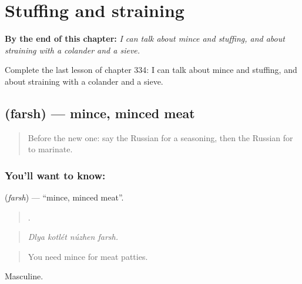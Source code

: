 
\chapter{Stuffing and straining}
\label{ch:ru-stuffing-and-straining}

\begin{chapteropening}
\textbf{By the end of this chapter:} \emph{I can talk about mince and stuffing, and about straining with a colander and a sieve.}

Complete the last lesson of chapter 334: I can talk about mince and stuffing, and about straining with a colander and a sieve.
\end{chapteropening}

\section[\texorpdfstring{\ru{фарш} (farsh)}{фарш (farsh)}]{ (farsh) — mince, minced meat}

\label{lesson:RU-C334-farsh}



\begin{quote}
Before the new one: say the Russian for a seasoning, then the Russian for to marinate.
\end{quote}

\subsection*{You'll want to know: }
\textbf{} (\emph{farsh}) — \textquotedblleft{}mince, minced meat\textquotedblright{}.

\begin{quote}
   .
\end{quote}

\begin{quote}
\emph{Dlya kotlét núzhen farsh.}
\end{quote}

\begin{quote}
You need mince for meat patties.
\end{quote}

Masculine.

